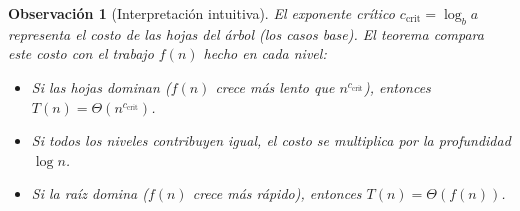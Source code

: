 \documentclass[a4paper,11pt]{report}
\newtheorem{remark}[theorem]{Observación}
\begin{document}
\begin{remark}[Interpretación intuitiva]
El exponente crítico $c_{\text{crit}} = \log_b a$ representa el costo de las hojas del árbol (los casos base). El teorema compara este costo con el trabajo $f(n)$ hecho en cada nivel:
\begin{itemize}
\item Si las hojas dominan ($f(n)$ crece más lento que $n^{c_{\text{crit}}}$), entonces $T(n) = \Theta(n^{c_{\text{crit}}})$.
\item Si todos los niveles contribuyen igual, el costo se multiplica por la profundidad $\log n$.
\item Si la raíz domina ($f(n)$ crece más rápido), entonces $T(n) = \Theta(f(n))$.
\end{itemize}
\end{remark}
\end{document}
